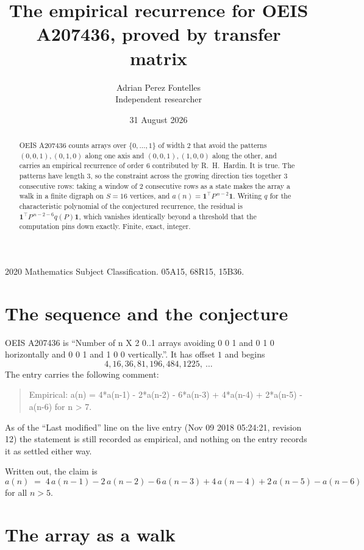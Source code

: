 \documentclass[11pt,a4paper]{article}
\title{The empirical recurrence for OEIS A207436, proved by transfer matrix}
\author{Adrian Perez Fontelles\\ \small Independent researcher}
\date{31 August 2026}
\theoremstyle{plain}
\theoremstyle{definition}
\begin{document}
\maketitle

\begin{abstract}
OEIS A207436 counts arrays over $\{0,\dots,1\}$ of width $2$ that avoid the patterns
$(0,0,1), (0,1,0)$ along one axis and $(0,0,1), (1,0,0)$ along the other, and carries an empirical recurrence of
order $6$ contributed by R.~H.~Hardin. It is true. The patterns have length $3$, so
the constraint across the growing direction ties together $3$ consecutive rows: taking a
window of $2$ consecutive rows as a state makes the array a walk in a finite digraph
on $S=16$ vertices, and $a(n)=\mathbf{1}^{\!\top}P^{\,n-2}\mathbf{1}$. Writing $q$
for the characteristic polynomial of the conjectured recurrence, the residual is
$\mathbf{1}^{\!\top}P^{\,n-2-6}q(P)\mathbf{1}$, which vanishes identically
beyond a threshold that the computation pins down exactly. Finite, exact, integer.
\end{abstract}

\noindent\small 2020 Mathematics Subject Classification. 05A15, 68R15, 15B36.\normalsize

\section{The sequence and the conjecture}

OEIS A207436 is ``Number of n X 2 0..1 arrays avoiding 0 0 1 and 0 1 0 horizontally and 0 0 1 and 1 0 0 vertically.''. It has offset
$1$ and begins
\[
4, 16, 36, 81, 196, 484, 1225,\ \dots
\]
The entry carries the following comment:
\begin{quote}\small
Empirical: a(n) = 4*a(n-1) - 2*a(n-2) - 6*a(n-3) + 4*a(n-4) + 2*a(n-5) - a(n-6) for n > 7.
\end{quote}
As of the ``Last modified'' line on the live entry (Nov 09 2018 05:24:21, revision
12) the statement is still recorded as empirical, and nothing on the entry
records it as settled either way.

Written out, the claim is
\begin{equation}\label{eq:conj}
a(n)\;=\;4\,a(n-1) - 2\,a(n-2) - 6\,a(n-3) + 4\,a(n-4) + 2\,a(n-5) - a(n-6)
\end{equation}
for all $n>5$. 

\section{The array as a walk}
\end{document}
